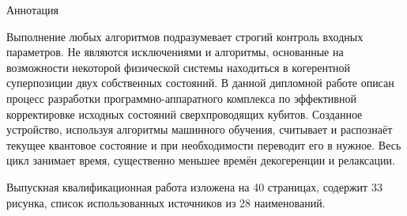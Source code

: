 
\begin{center}
	\large Аннотация
\end{center}



Выполнение любых алгоритмов подразумевает строгий контроль входных параметров. Не являются исключениями и алгоритмы, основанные на возможности некоторой физической системы находиться в когерентной суперпозиции двух собственных состояний. В данной дипломной работе описан процесс разработки программно-аппаратного комплекса по эффективной корректировке исходных состояний сверхпроводящих кубитов. Созданное устройство, используя алгоритмы машинного обучения, считывает и распознаёт текущее квантовое состояние и при необходимости переводит его в нужное. Весь цикл занимает время, существенно меньшее времён декогеренции и релаксации.

Выпускная квалификационная работа изложена на 40 страницах, содержит 33 рисунка, список использованных источников из 28 наименований. 